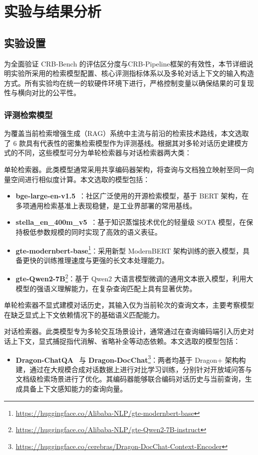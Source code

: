 \chapter{实验与结果分析}

\section{实验设置}
\label{sec:exp_setup}

为全面验证 CRB-Bench 的评估区分度与CRB-Pipeline框架的有效性，本节详细说明实验所采用的检索模型配置、核心评测指标体系以及多轮对话上下文的输入构造方式。所有实验均在统一的软硬件环境下进行，严格控制变量以确保结果的可复现性与横向对比的公平性。

\subsection{评测检索模型}

为覆盖当前检索增强生成（RAG）系统中主流与前沿的检索技术路线，本文选取了 6 款具有代表性的密集检索模型作为评测基线。根据其对多轮对话历史建模方式的不同，这些模型可分为单轮检索器与对话检索器两大类：

单轮检索器。此类模型通常采用共享编码器架构，将查询与文档独立映射至同一向量空间进行相似度计算。本文选取的模型包括：
\begin{itemize}
    \item \textbf{bge-large-en-v1.5}~\citep{xiao2023cpack}：社区广泛使用的开源检索模型，基于 BERT 架构，在多项通用检索基准上表现稳健，是工业界部署的常用基线。
    \item \textbf{stella\_en\_400m\_v5}~\citep{Zhang2024JasperAS}：基于知识蒸馏技术优化的轻量级 SOTA 模型，在保持极低参数规模的同时实现了高效的语义表征。
    \item \textbf{gte-modernbert-base}\footnote{\url{https://huggingface.co/Alibaba-NLP/gte-modernbert-base}}：采用新型 ModernBERT 架构训练的嵌入模型，具备更快的训练推理速度与更强的长文本处理能力。
    \item \textbf{gte-Qwen2-7B}\footnote{\url{https://huggingface.co/Alibaba-NLP/gte-Qwen2-7B-instruct}}：基于 Qwen2 大语言模型微调的通用文本嵌入模型，利用大模型的强语义理解能力，在复杂查询匹配上具有显著优势。
\end{itemize}

单轮检索器不显式建模对话历史，其输入仅为当前轮次的查询文本，主要考察模型在缺乏显式上下文依赖情况下的基础语义匹配能力。

对话检索器。此类模型专为多轮交互场景设计，通常通过在查询编码端引入历史对话上下文，显式捕捉指代消解、省略补全等动态依赖。本文选取的模型包括：
\begin{itemize}
    \item \textbf{Dragon-ChatQA}~\citep{Liu2024ChatQASG} 与 \textbf{Dragon-DocChat}\footnote{\url{https://huggingface.co/cerebras/Dragon-DocChat-Context-Encoder}}：两者均基于 Dragon+ 架构构建，通过在大规模合成对话数据上进行对比学习训练，分别针对开放域问答与文档级检索场景进行了优化。其编码器能够联合编码对话历史与当前查询，生成具备上下文感知能力的查询向量。
\end{itemize}

